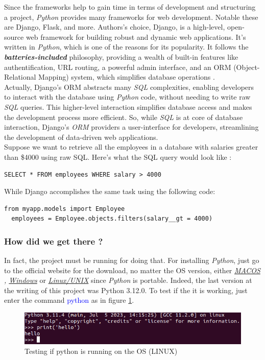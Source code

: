 \documentclass[12pt,a4paper]{report}
\begin{document}
	 Since the frameworks help to gain time in terms of development and structuring a project, \textit{Python} provides many frameworks for web development. Notable these are Django, Flask, and more. Authors's choice, Django, is a high-level, open-source web framework for building robust and dynamic web applications. It's written in \textit{Python}, which is one of the reasons for its popularity. It follows the \textbf{\textit{batteries-included}} philosophy, providing a wealth of built-in features like authentification, URL routing, a powerful admin interface, and an ORM (Object-Relational Mapping) system, which simplifies database operations \cite{alchin2013pro}. \\
	 
	Actually, Django's ORM abstracts many \textit{SQL} complexities, enabling developers to interact with the database using \textit{Python} code, without needing to write raw \textit{SQL} queries. This higher-level interaction simplifies database access and makes the development process more efficient. So, while \textit{SQL} is at core of database interaction, Django's \textit{ORM} providers a user-interface for developers, streamlining the development of data-driven web applications.\\ 
	Suppose we want to retrieve all the employees in a database with salaries greater than \$4000 using raw SQL. Here's what the SQL query would look like : 	
\begin{lstlisting}[style=stylepython]
 SELECT * FROM employees WHERE salary > 4000
\end{lstlisting}
  While Django accomplishes the same task using the following code:
\begin{lstlisting}[style=stylepython]
from myapp.models import Employee
  employees = Employee.objects.filters(salary__gt = 4000)
\end{lstlisting}
    \subsubsection*{How did we get there ?}
   In fact, the project must be running for doing that. For installing \textit{Python}, just go to the official website for the  download, no matter the OS version, either \textit{ \href{https://www.python.org/downloads/macos/}{MACOS} , \href{https://www.python.org/downloads/windows/}{Windows} } or \href{https://www.python.org/downloads/source/}{\textit{Linux/UNIX}} since \textit{Python} is portable. Indeed, the last version at the writing of this project was Python 3.12.0. To test if the it is working, just enter the command \textcolor{blue}{python} as in figure \ref{fig:testpython}.
   \begin{figure}
   	\centering
   	\includegraphics[width=1\linewidth]{testPython}
   	\caption{Testing if python is running on the OS (LINUX)}
   	\label{fig:testpython}
   \end{figure}
   
\end{document}
